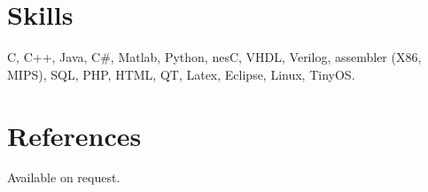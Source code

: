 \documentclass[margin,line]{res}
\newenvironment{list1}{
  \begin{list}{\ding{113}}{
      \setlength{\itemsep}{0in}
      \setlength{\parsep}{0in} \setlength{\parskip}{0in}
      \setlength{\topsep}{0in} \setlength{\partopsep}{0in}
      \setlength{\leftmargin}{0.17in}}}{\end{list}}
\newenvironment{list2}{
  \begin{list}{$\bullet$}{
      \setlength{\itemsep}{0in}
      \setlength{\parsep}{0in} \setlength{\parskip}{0in}
      \setlength{\topsep}{0in} \setlength{\partopsep}{0in}
      \setlength{\leftmargin}{0.2in}}}{\end{list}}
\begin{document}
\begin{resume}
\begin{list1}
      \end{list1}
%
%

    \section{\sc Skills}
      C, C++, Java, C\#, Matlab, Python, nesC, VHDL, Verilog, assembler (X86, MIPS), SQL, PHP, HTML, QT, Latex, Eclipse, Linux, TinyOS.

    \section{\sc References}
      Available on request.

  \end{resume}
\end{document}
